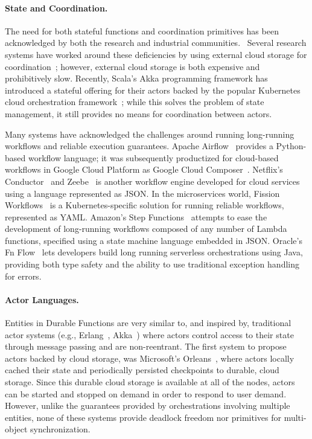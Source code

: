 {\paragraph{State and Coordination.} The need for both stateful functions and coordination primitives has been acknowledged by both the research and industrial communities.~\cite{DBLP:conf/cidr/HellersteinFGSS19,DBLP:journals/corr/abs-1902-03383,DBLP:conf/cidr/Schleier-Smith19,8481652} Several research systems have worked around these deficiencies by using external cloud storage for coordination~\cite{201559, 216767}; however, external cloud storage is both expensive and prohibitively slow.  Recently, Scala's Akka programming framework has introduced a stateful offering for their actors backed by the popular Kubernetes cloud orchestration framework~\cite{akka-stateful-serverless}; while this solves the problem of state management, it still provides no means for coordination between actors.


Many systems have acknowledged the challenges around running long-running workflows and reliable execution guarantees.  Apache Airflow~\cite{airflow} provides a Python-based workflow language; it was subsequently productized for cloud-based workflows in Google Cloud Platform as Google Cloud Composer~\cite{cloudcomposer}.  Netflix's Conductor~\cite{conductor} and Zeebe~\cite{zeebe} is another workflow engine developed for cloud services using a language represented as JSON.  In the microservices world, Fission Workflows~\cite{fission} is a Kubernetes-specific solution for running reliable workflows, represented as YAML.  Amazon's Step Functions~\cite{aws-step-functions} attempts to ease the development of long-running workflows composed of any number of Lambda functions, specified using a state machine language embedded in JSON.  Oracle's Fn Flow~\cite{flow} lets developers build long running serverless orchestrations using Java, providing both type safety and the ability to use traditional exception handling for errors.


\paragraph{Actor Languages.}  Entities in Durable Functions are very similar to, and inspired by, traditional actor systems (e.g., Erlang~\cite{armstrong1997development}, Akka~\cite{haller2012integration}) where actors control access to their state through message passing and are non-reentrant.  The first system to propose actors backed by cloud storage, was Microsoft's Orleans~\cite{bykov2011orleans}, where actors locally cached their state and periodically persisted checkpoints to durable, cloud storage.  Since this durable cloud storage is available at all of the nodes, actors can be started and stopped on demand in order to respond to user demand.  However, unlike the guarantees provided by orchestrations involving multiple entities, none of these systems provide deadlock freedom nor primitives for multi-object synchronization. 

}
